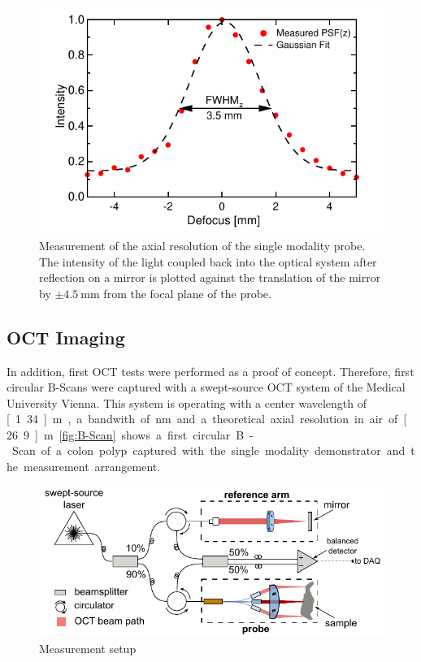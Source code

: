 \begin{figure}[h!]\centering \includegraphics{figures/50_Measurements/conf/res/PSFz.pdf}
      \caption{Measurement of the axial resolution of the single modality probe. The intensity of the light coupled back into the optical system after reflection on a mirror is plotted against the translation of the mirror by $\pm \SI{4.5}{\milli\meter}$ from the focal plane of the probe. }
      \label{fig:FWHM}
\end{figure}


\clearpage
\subsection{OCT Imaging}


In addition, first OCT tests were performed as a proof of concept. Therefore, first circular B-Scans were captured with a swept-source OCT system of the Medical University Vienna. This system is operating with a center wavelength of \unit[1.34]{\textmu m}, a bandwith of \unit[37]{nm} and a theoretical axial resolution in air of \unit[26.9]{\textmu m}. \autoref{fig:B-Scan} shows a first circular B-Scan of a colon polyp captured with the single modality demonstrator and the measurement arrangement. 

\begin{figure}[h!]\centering \includegraphics[width=12cm]{figures/50_Measurements/oct/octSetupVienna.pdf}
      \caption{Measurement setup}
\end{figure}


